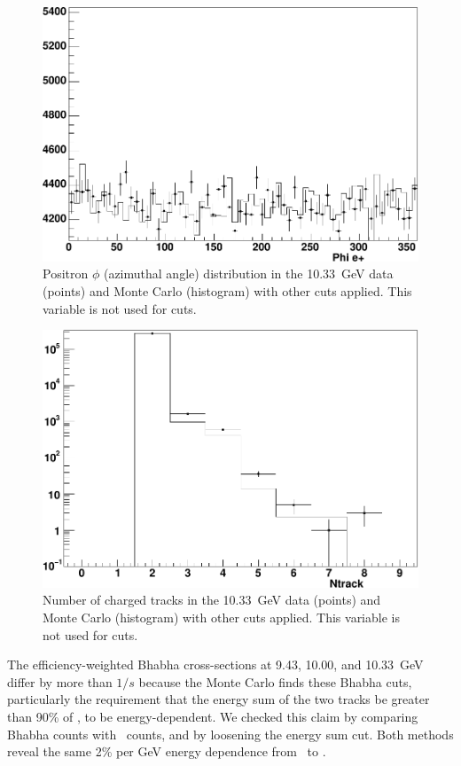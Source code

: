 \documentclass{cornell}
\begin{document}
\begin{figure}[p]
  \begin{center}
    \includegraphics[width=0.7\linewidth]{plots/eeagreemente}
  \end{center}
  \caption[Positron $\phi$ distribution in Bhabha events]{\label{eeagreementg} Positron $\phi$ (azimuthal angle)
  distribution in the 10.33~GeV data (points) and Monte Carlo
  (histogram) with other cuts applied.  This variable is not used for
  cuts.}
\end{figure}

\begin{figure}[p]
  \begin{center}
    \includegraphics[width=0.7\linewidth]{plots/eeagreementh}
  \end{center}
  \caption[Number of charged tracks in Bhabha events]{\label{eeagreementh} Number of charged tracks in the
  10.33~GeV data (points) and Monte Carlo (histogram) with other cuts
  applied.  This variable is not used for cuts.}
\end{figure}

The efficiency-weighted Bhabha cross-sections at 9.43, 10.00, and
10.33~GeV differ by more than $1/s$ because the Monte Carlo finds
these Bhabha cuts, particularly the requirement that the energy sum of
the two tracks be greater than 90\% of \ecm, to be energy-dependent.
We checked this claim by comparing Bhabha counts with \gamgam\ counts,
and by loosening the energy sum cut.  Both methods reveal the same 2\%
per GeV energy dependence from \us\ to \usss.
\end{document}
